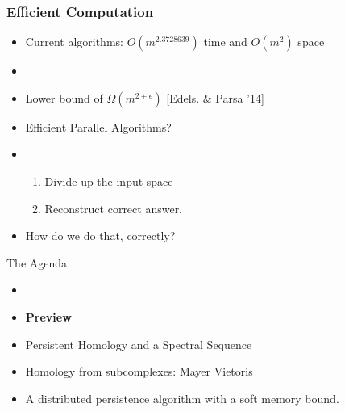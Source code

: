 \begin{frame}
\frametitle{Efficient Computation}
\hspace{1in}
\begin{itemize}
\item<1->[Problem:] Current algorithms: $O(m^{2.3728639})$ time and $O(m^2)$ space
\item<2->[Goal:] 
\item<3->[Issue:] Lower bound of $\Omega(m^{2+\epsilon})$  [Edels. \& Parsa '14]
\item<5->[New Goal:] Efficient Parallel Algorithms?
\item<6->[Approach:] \begin{enumerate}
			\item Divide up the input space
			\item Reconstruct correct answer.
			\end{enumerate}
\item<7->[Question:] How do we do that, correctly?
\end{itemize}
\end{frame}

\begin{frame}{The Agenda}
\begin{itemize}
\item {\color{gray}{Motivation \& Background}}
\item \textbf{Preview}
\item Persistent Homology and a Spectral Sequence
\item Homology from subcomplexes: Mayer Vietoris 
\item A distributed persistence algorithm with a soft memory bound.
\end{itemize}
\end{frame}
